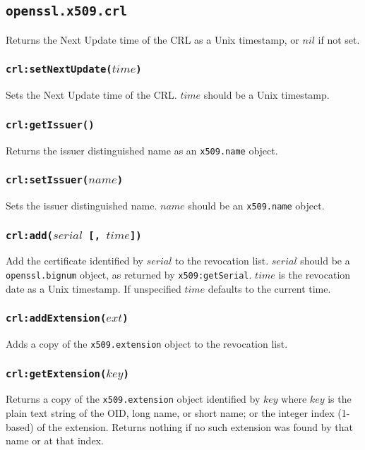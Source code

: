 \documentclass[11pt, oneside]{memoir}
\newcommand*{\fn}[1]{\texttt{#1}\xspace}
\newcommand*{\module}[1]{\texttt{#1}\xspace}
\newcounter{toccols}
\newenvironment{Module}[1]{
	\subsection{\texttt{#1}}
	\addtocontents{toc}{
		\protect\begin{multicols}{\value{toccols}}
	}
}{
	\addtocontents{toc}{\protect\end{multicols}}
}
\begin{document}
\begin{Module}{openssl.x509.crl}
Returns the Next Update time of the CRL as a Unix timestamp, or $nil$ if not set.

\subsubsection[\fn{crl:setNextUpdate}]{\fn{crl:setNextUpdate($time$)}}

Sets the Next Update time of the CRL. $time$ should be a Unix timestamp.

\subsubsection[\fn{crl:getIssuer}]{\fn{crl:getIssuer()}}

Returns the issuer distinguished name as an \module{x509.name} object.

\subsubsection[\fn{crl:setIssuer}]{\fn{crl:setIssuer($name$)}}

Sets the issuer distinguished name. $name$ should be an \module{x509.name} object.

\subsubsection[\fn{crl:add}]{\fn{crl:add($serial$ [, $time$])}}

Add the certificate identified by $serial$ to the revocation list. $serial$ should be a \module{openssl.bignum} object, as returned by \fn{x509:getSerial}. $time$ is the revocation date as a Unix timestamp. If unspecified $time$ defaults to the current time.

\subsubsection[\fn{crl:addExtension}]{\fn{crl:addExtension($ext$)}}

Adds a copy of the \module{x509.extension} object to the revocation list.

\subsubsection[\fn{crl:getExtension}]{\fn{crl:getExtension($key$)}}

Returns a copy of the \module{x509.extension} object identified by $key$ where $key$ is the plain text string of the OID, long name, or short name; or the integer index (1-based) of the extension. Returns nothing if no such extension was found by that name or at that index.


\end{Module}
\end{document}
